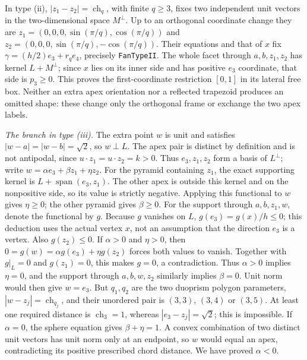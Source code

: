 \documentclass[11pt]{article}
\theoremstyle{definition}
\theoremstyle{remark}
\newcommand{\ch}{\operatorname{ch}}
\begin{document}
In type (ii), $|z_1-z_2|=\ch_q$, with finite $q\ge3$,
fixes two independent unit vectors in the two-dimensional space
$M^\perp$. Up to an orthogonal coordinate change they are
$z_1=(0,0,0,\sin(\pi/q),\cos(\pi/q))$ and
$z_2=(0,0,0,\sin(\pi/q),-\cos(\pi/q))$.
Their equations and that of $x$ fix
$\gamma=(h/2)e_3+r_q e_4$, precisely \texttt{FanTypeII}.
The whole facet through $a,b,z_1,z_2$ has kernel
$L+M^\perp$; since $x$ lies on its inner side and has positive
$e_3$ coordinate, that side is $p_3\ge0$.
This proves the first-coordinate restriction $[0,1]$ in its lateral
free box. Neither an extra apex orientation nor a reflected trapezoid
produces an omitted shape: these change only the orthogonal frame or
exchange the two apex labels.

\emph{The branch in type (iii).}
The extra point $w$ is unit and satisfies
$|w-a|=|w-b|=\sqrt2$, so $w\perp L$.
The apex pair is distinct by definition and is not antipodal, since
$u\cdot z_1=u\cdot z_2=k>0$. Thus $e_3,z_1,z_2$ form a basis of
$L^\perp$; write $w=\alpha e_3+\beta z_1+\eta z_2$.
For the pyramid containing $z_1$, the exact supporting kernel is
$L+\operatorname{span}(e_3,z_1)$. The other apex is outside this kernel
and on the nonpositive side, so its value is strictly negative.
Applying this functional to $w$ gives $\eta\ge0$; the other pyramid
gives $\beta\ge0$.
For the support through $a,b,z_1,w$, denote the functional by $g$.
Because $g$ vanishes on $L$,
$g(e_3)=g(x)/h\le0$; this deduction uses the actual vertex $x$, not an
assumption that the direction $e_3$ is a vertex. Also $g(z_2)\le0$.
If $\alpha>0$ and $\eta>0$, then
$0=g(w)=\alpha g(e_3)+\eta g(z_2)$ forces both values to vanish.
Together with $g|_L=0$ and $g(z_1)=0$, this makes $g=0$, a contradiction.
Thus $\alpha>0$ implies $\eta=0$, and the support through $a,b,w,z_2$
similarly implies $\beta=0$. Unit norm would then give $w=e_3$.
But $q_1,q_2$ are the two duoprism polygon parameters,
$|w-z_j|=\ch_{q_j}$, and their unordered pair is
$(3,3)$, $(3,4)$ or $(3,5)$. At least one required distance is
$\ch_3=1$, whereas $|e_3-z_j|=\sqrt2$; this is impossible.
If $\alpha=0$, the sphere equation gives $\beta+\eta=1$.
A convex combination of two distinct unit vectors has unit norm only at
an endpoint, so $w$ would equal an apex, contradicting its positive
prescribed chord distance. We have proved $\alpha<0$.
\end{document}
